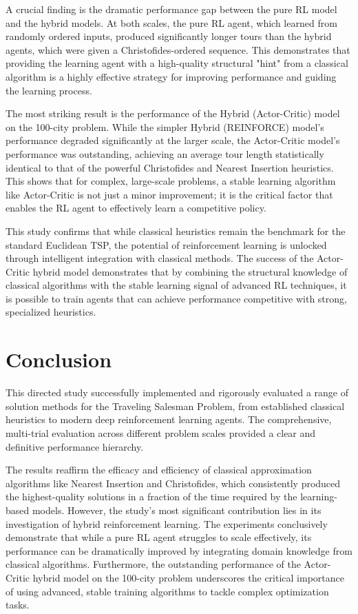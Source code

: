 \documentclass[12pt]{article}
\theoremstyle{remarkstyle}
\begin{document}
A crucial finding is the dramatic performance gap between the pure RL model and the hybrid models. At both scales, the pure RL agent, which learned from randomly ordered inputs, produced significantly longer tours than the hybrid agents, which were given a Christofides-ordered sequence. This demonstrates that providing the learning agent with a high-quality structural "hint" from a classical algorithm is a highly effective strategy for improving performance and guiding the learning process.

The most striking result is the performance of the Hybrid (Actor-Critic) model on the 100-city problem. While the simpler Hybrid (REINFORCE) model's performance degraded significantly at the larger scale, the Actor-Critic model's performance was outstanding, achieving an average tour length statistically identical to that of the powerful Christofides and Nearest Insertion heuristics. This shows that for complex, large-scale problems, a stable learning algorithm like Actor-Critic is not just a minor improvement; it is the critical factor that enables the RL agent to effectively learn a competitive policy.

This study confirms that while classical heuristics remain the benchmark for the standard Euclidean TSP, the potential of reinforcement learning is unlocked through intelligent integration with classical methods. The success of the Actor-Critic hybrid model demonstrates that by combining the structural knowledge of classical algorithms with the stable learning signal of advanced RL techniques, it is possible to train agents that can achieve performance competitive with strong, specialized heuristics.


\section{Conclusion}
This directed study successfully implemented and rigorously evaluated a range of solution methods for the Traveling Salesman Problem, from established classical heuristics to modern deep reinforcement learning agents. The comprehensive, multi-trial evaluation across different problem scales provided a clear and definitive performance hierarchy.

The results reaffirm the efficacy and efficiency of classical approximation algorithms like Nearest Insertion and Christofides, which consistently produced the highest-quality solutions in a fraction of the time required by the learning-based models. However, the study's most significant contribution lies in its investigation of hybrid reinforcement learning. The experiments conclusively demonstrate that while a pure RL agent struggles to scale effectively, its performance can be dramatically improved by integrating domain knowledge from classical algorithms. Furthermore, the outstanding performance of the Actor-Critic hybrid model on the 100-city problem underscores the critical importance of using advanced, stable training algorithms to tackle complex optimization tasks.
\end{document}
